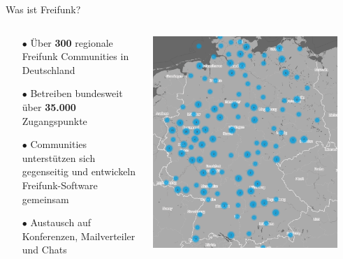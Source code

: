 \documentclass[10pt]{beamer}
\begin{document}
    \begin{frame}{Was ist Freifunk?}
    \begin{columns}[T]
     \begin{column}{5cm}
        \begin{itemize}
          \item[\textcolor{freifunkpink}{\Large$\bullet$}] Über \textbf{300} regionale Freifunk Communities in Deutschland
          \item[\textcolor{freifunkpink}{\Large$\bullet$}] Betreiben bundesweit über \textbf{35.000} Zugangspunkte
          \item[\textcolor{freifunkpink}{\Large$\bullet$}] Communities unterstützen sich gegenseitig und entwickeln Freifunk-Software gemeinsam
          \item[\textcolor{freifunkpink}{\Large$\bullet$}] Austausch auf Konferenzen, Mailverteiler und Chats
        \end{itemize}
      \end{column}
      \begin{column}{5cm}
        \includegraphics[width=0.9\textwidth]{images/community_map}
      \end{column}
    \end{columns}
   \end{frame}
\end{document}
